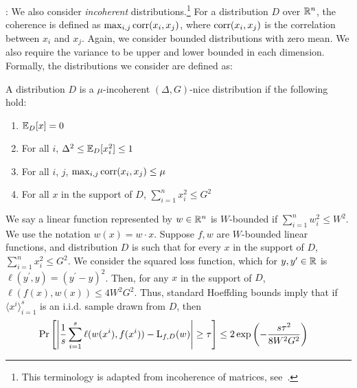: We also consider \emph{incoherent}
distributions.\footnote{This terminology is adapted from incoherence of
matrices, \eg see~\cite{Donoho:2009-sparse}.} For a distribution $D$ over
$\mathbb{R}^n$, the coherence is defined as $\max_{i, j} \mathrm{corr}(x_i, x_j)$, where
$\mathrm{corr}(x_i, x_j)$ is the correlation between $x_i$ and $x_j$. Again, we consider
bounded distributions with zero mean. We also require the variance to be upper
and lower bounded in each dimension. Formally, the distributions we consider are
defined as:

\begin{definition}
\label{defn:bhutan} A distribution $D$ is a $\mu$-incoherent $(\Delta, G)$-nice
distribution if the following hold:
\begin{enumerate}
\item $\mathbb{E}_D[x] = 0$
\item For all $i$, $\Delta^2 \leq \mathbb{E}_D[x_i^2] \leq 1$
\item For all $i$, $j$, $\max_{i, j} \mathrm{corr}(x_i, x_j) \leq \mu$
\item For all $x$ in the support of $D$, $\sum_{i=1}^n x_i^2 \leq G^2$
\end{enumerate}
\end{definition}


We say a linear function represented by $w \in \mathbb{R}^n$ is $W$-bounded if
$\sum_{i=1}^n w_i^2 \leq W^2$. We use the notation $w(x) = w \cdot x$. Suppose
$f, w$ are $W$-bounded linear functions, and distribution $D$ is such that for every
$x$ in the support of $D$, $\sum_{i=1}^n x_i^2 \leq G^2$.  We consider the
squared loss function, which for $y, y^\prime \in \mathbb{R}$ is $\ell(y^\prime, y) =
(y^\prime - y)^2$.  Then, for any $x$ in the support of $D$, $\ell(f(x), w(x))
\leq 4 W^2G^2$. Thus, standard Hoeffding bounds imply that
if $\langle x^i \rangle_{i=1}^s$ is an i.i.d. sample drawn from $D$, then
\begin{align}
\Pr\left[\left| \frac{1}{s} \sum_{i=1}^s \ell(w(x^i), f(x^i)) - \mathrm{L}_{f, D}(w)
\right| \geq \tau \right] &\leq 2 \exp\left( -\frac{ s \tau^2}{8W^2G^2}\right)
\label{eqn:concentration}
\end{align}

